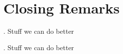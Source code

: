 \section{Closing Remarks}

\begin{frame}{\thesection. \insertsection}
	Stuff we can do better
\end{frame}


\begin{frame}{\thesection. \insertsection}
	Stuff we can do better
\end{frame}